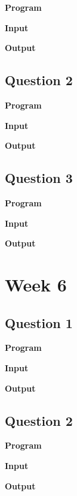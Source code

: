 \documentclass{article}
\begin{document}
\noindent \textbf{\large{Program}}

\newpage
\noindent \textbf{\large{Input}}

\noindent \textbf{\large{Output}}


\newpage
\subsection{Question 2}

\newline

\noindent \textbf{\large{Program}}

\newpage
\noindent \textbf{\large{Input}}

\noindent \textbf{\large{Output}}


\newpage
\subsection{Question 3}

\newline

\noindent \textbf{\large{Program}}

\newpage
\noindent \textbf{\large{Input}}

\noindent \textbf{\large{Output}}

\newpage
\section{Week 6}

\subsection{Question 1}

\newline

\noindent \textbf{\large{Program}}

\newpage
\noindent \textbf{\large{Input}}

\noindent \textbf{\large{Output}}


\newpage
\subsection{Question 2}

\newline

\noindent \textbf{\large{Program}}

\newpage
\noindent \textbf{\large{Input}}

\noindent \textbf{\large{Output}}

\end{document}
